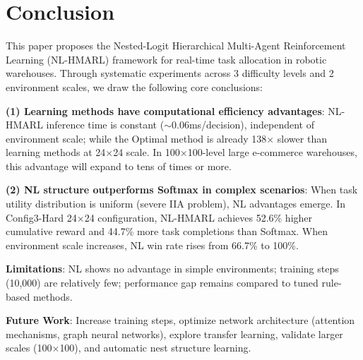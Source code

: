 \documentclass[12pt,a4paper]{article}
\begin{document}
\section{Conclusion}

This paper proposes the Nested-Logit Hierarchical Multi-Agent Reinforcement Learning (NL-HMARL) framework for real-time task allocation in robotic warehouses. Through systematic experiments across 3 difficulty levels and 2 environment scales, we draw the following core conclusions:

\textbf{(1) Learning methods have computational efficiency advantages}: NL-HMARL inference time is constant ($\sim$0.06ms/decision), independent of environment scale; while the Optimal method is already 138$\times$ slower than learning methods at 24$\times$24 scale. In 100$\times$100-level large e-commerce warehouses, this advantage will expand to tens of times or more.

\textbf{(2) NL structure outperforms Softmax in complex scenarios}: When task utility distribution is uniform (severe IIA problem), NL advantages emerge. In Config3-Hard 24$\times$24 configuration, NL-HMARL achieves 52.6\% higher cumulative reward and 44.7\% more task completions than Softmax. When environment scale increases, NL win rate rises from 66.7\% to 100\%.

\textbf{Limitations}: NL shows no advantage in simple environments; training steps (10,000) are relatively few; performance gap remains compared to tuned rule-based methods.

\textbf{Future Work}: Increase training steps, optimize network architecture (attention mechanisms, graph neural networks), explore transfer learning, validate larger scales (100$\times$100), and automatic nest structure learning.



\end{document}
